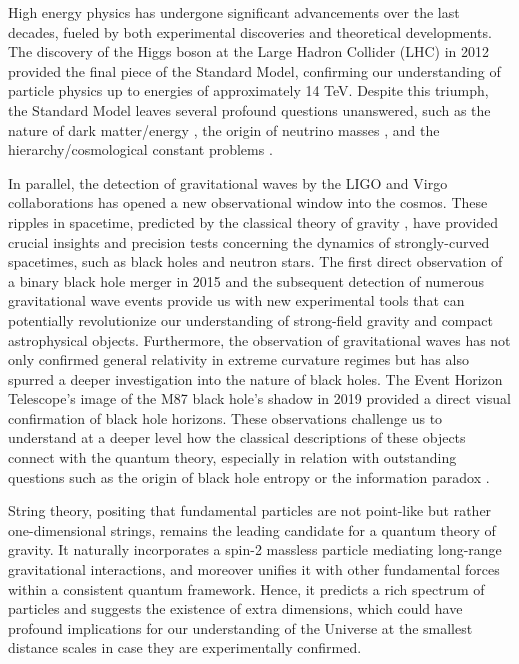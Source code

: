 High energy physics has undergone significant advancements over the last decades, fueled by both experimental discoveries and theoretical developments. The discovery of the Higgs boson \cite{ATLAS:2012yve, CMS:2012qbp} at the Large Hadron Collider (LHC) in 2012 provided the final piece of the Standard Model, confirming our understanding of particle physics up to energies of approximately 14 TeV. Despite this triumph, the Standard Model leaves several profound questions unanswered, such as the nature of dark matter/energy \cite{Planck:2015fie}, the origin of neutrino masses \cite{Super-Kamiokande:1998uiq,SNO:2002tuh,KamLAND:2002uet}, and the hierarchy/cosmological constant problems \cite{Weinberg:1988cp}.

In parallel, the detection of gravitational waves by the LIGO and Virgo collaborations \cite{LIGO} has opened a new observational window into the cosmos. These ripples in spacetime, predicted by the classical theory of gravity \cite{GW1,GW2}, have provided crucial insights and precision tests concerning the dynamics of strongly-curved spacetimes, such as black holes and neutron stars. The first direct observation of a binary black hole merger in 2015 and the subsequent detection of numerous gravitational wave events  provide us with new experimental tools that can potentially revolutionize our understanding of strong-field gravity and compact astrophysical objects. Furthermore, the observation of gravitational waves has not only confirmed general relativity in extreme curvature regimes but has also spurred a deeper investigation into the nature of black holes. The Event Horizon Telescope's image of the M87 black hole's shadow in 2019 \cite{EventHorizonTelescope:2019dse} provided a direct visual confirmation of black hole horizons. These observations challenge us to understand at a deeper level how the classical descriptions of these objects connect with the quantum theory, especially in relation with outstanding questions such as the origin of black hole entropy \cite{Bekenstein:1972tm,Hawking:1975vcx} or the information paradox \cite{hawking2015information}.

String theory, positing that fundamental particles are not point-like but rather one-dimensional strings, remains the leading candidate for a quantum theory of gravity. It naturally incorporates a spin-2 massless particle mediating long-range gravitational interactions, and moreover unifies it with other fundamental forces within a consistent quantum framework. Hence, it predicts a rich spectrum of particles and suggests the existence of extra dimensions, which could have profound implications for our understanding of the Universe at the smallest distance scales in case they are experimentally confirmed.

